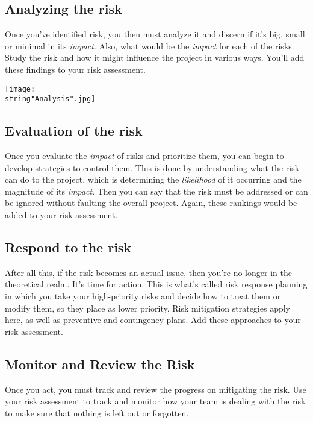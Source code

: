 \documentclass[a4paper,12pt]{article}
\begin{document}
\subsection{Analyzing the risk}
Once you’ve identified risk, you then must analyze it and discern if it’s big, small or minimal in its \emph{impact}. Also, what would be the \emph{impact} for each of the risks. Study the risk and how it might influence the project in various ways. You’ll add these findings to your risk assessment.



\begin{center}
\vspace*{\fill}\texttt{[image: \\string"Analysis".jpg]}\vspace*{\fill}
\par\end{center}

\subsection{Evaluation of the risk}
Once you evaluate the \emph{impact} of risks and prioritize them, you can begin to develop strategies to control them. This is done by understanding what the risk can do to the project, which is determining the \emph{likelihood} of it occurring and the magnitude of its \emph{impact}. Then you can say that the risk must be addressed or can be ignored without faulting the overall project. Again, these rankings would be added to your risk assessment.


\subsection{Respond to the risk}
After all this, if the risk becomes an actual issue, then you’re no longer in the theoretical realm. It’s time for action. This is what’s called risk response planning in which you take your high-priority risks and decide how to treat them or modify them, so they place as lower priority. Risk mitigation strategies apply here, as well as preventive and contingency plans. Add these approaches to your risk assessment.


\subsection{Monitor and Review the Risk}
Once you act, you must track and review the progress on mitigating the risk. Use your risk assessment to track and monitor how your team is dealing with the risk to make sure that nothing is left out or forgotten.


\clearpage

\printindex
\end{document}
